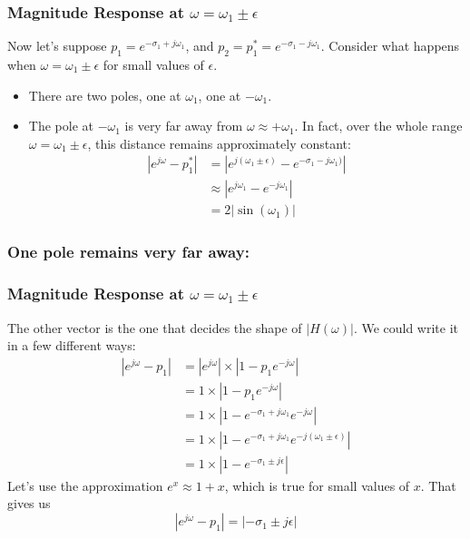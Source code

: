 \documentclass{beamer}
\begin{document}
\begin{frame}
  \frametitle{Magnitude Response at $\omega=\omega_1\pm\epsilon$}

  Now let's suppose $p_1=e^{-\sigma_1+j\omega_1}$, and
  $p_2=p_1^*=e^{-\sigma_1-j\omega_1}$.  Consider what happens when
  $\omega=\omega_1\pm\epsilon$ for small values of $\epsilon$.
  \begin{itemize}
  \item There are two poles, one at $\omega_1$, one at $-\omega_1$.
  \item The pole at $-\omega_1$ is very far away from $\omega\approx +\omega_1$.
    In fact, over the whole range $\omega=\omega_1\pm\epsilon$, this distance
    remains approximately constant:
    \begin{align*}
      |e^{j\omega}-p_1^*|&= |e^{j(\omega_1\pm\epsilon)}-e^{-\sigma_1-j\omega_1)}|\\
      &\approx |e^{j\omega_1}-e^{-j\omega_1}|\\
      &= 2|\sin(\omega_1)|
    \end{align*}
  \end{itemize}
\end{frame}  

\begin{frame}
  \frametitle{One pole remains very far away:}
  \centerline{}
\end{frame}

\begin{frame}
  \frametitle{Magnitude Response at $\omega=\omega_1\pm\epsilon$}

  The other vector is the one that decides the shape of $|H(\omega)|$.  We could write
  it in a  few different ways:
  \begin{align*}
    |e^{j\omega}-p_1|&= |e^{j\omega}|\times |1-p_1e^{-j\omega}|\\
    &= 1\times |1-p_1e^{-j\omega}|\\
    &= 1\times |1-e^{-\sigma_1+j\omega_1}e^{-j\omega}|\\
    &= 1\times |1-e^{-\sigma_1+j\omega_1}e^{-j(\omega_1\pm\epsilon)}|\\
    &= 1\times |1-e^{-\sigma_1\pm j\epsilon}|
  \end{align*}
  Let's use the approximation $e^x\approx 1+x$, which is true for
  small values of $x$.  That gives us
  \begin{displaymath}
    |e^{j\omega}-p_1|= |-\sigma_1\pm j\epsilon|
  \end{displaymath}
\end{frame}
\end{document}

